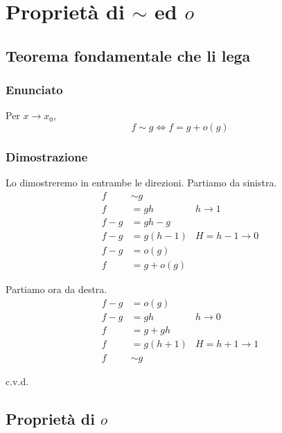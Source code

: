 \documentclass[../../analisi1]{subfiles}
\begin{document}
    \chapter{Proprietà di \texorpdfstring{\(\sim\) ed \(o\)}{asintotico ed o-piccolo}}

        \section*{Teorema fondamentale che li lega}

            \subsection*{Enunciato}

                Per \(x \to x_0\),
                \[
                    f \sim g \iff f = g + o(g)
                \]

            \subsection*{Dimostrazione}

                Lo dimostreremo in entrambe le direzioni. Partiamo da sinistra.
                \begin{align*}
                    f &\sim g\\
                    f &= gh & h \to 1\\
                    f - g &= gh - g\\
                    f - g &= g (h - 1) & H = h - 1 \to 0\\
                    f - g &= o(g)\\
                    f &= g + o(g)
                \end{align*}

                Partiamo ora da destra.
                \begin{align*}
                    f - g &= o(g)\\
                    f - g &= gh & h \to 0\\
                    f &= g + gh\\
                    f &= g (h + 1) & H = h + 1 \to 1\\
                    f &\sim g
                \end{align*}
                
                c.v.d.

        \section*{Proprietà di \(o\)}
\end{document}
